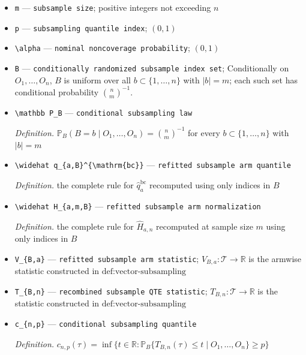 \documentclass{article}
\begin{document}
\begin{itemize}
  \item \texttt{m} --- \texttt{subsample size}; positive integers not exceeding \(n\)
  \item \texttt{p} --- \texttt{subsampling quantile index}; \((0,1)\)
  \item \texttt{\textbackslash{}\allowbreak{}alpha} --- \texttt{nominal noncoverage probability}; \((0,1)\)
  \item \texttt{B} --- \texttt{conditionally randomized subsample index set}; Conditionally on \(O_1,\ldots,O_n\), \(B\) is uniform over all \(b\subset\{1,\ldots,n\}\) with \(|b|=m\); each such set has conditional probability \(\binom{n}{m}^{-1}\).
  \item \texttt{\textbackslash{}\allowbreak{}mathbb P\_\allowbreak{}B} --- \texttt{conditional subsampling law}
  \par\smallskip\noindent\emph{Definition.} \(\mathbb P_B(B=b\mid O_1,\ldots,O_n)=\binom{n}{m}^{-1}\) for every \(b\subset\{1,\ldots,n\}\) with \(|b|=m\)
  \item \texttt{\textbackslash{}\allowbreak{}widehat q\_\allowbreak{}\{a,\allowbreak{}B\}\allowbreak{}\textasciicircum{}\{\textbackslash{}\allowbreak{}mathrm\{bc\}\allowbreak{}\}\allowbreak{}} --- \texttt{refitted subsample arm quantile}
  \par\smallskip\noindent\emph{Definition.} the complete rule for \(\widehat q_a^{\mathrm{bc}}\) recomputed using only indices in \(B\)
  \item \texttt{\textbackslash{}\allowbreak{}widehat H\_\allowbreak{}\{a,\allowbreak{}m,\allowbreak{}B\}\allowbreak{}} --- \texttt{refitted subsample arm normalization}
  \par\smallskip\noindent\emph{Definition.} the complete rule for \(\widehat H_{a,n}\) recomputed at sample size \(m\) using only indices in \(B\)
  \item \texttt{V\_\allowbreak{}\{B,\allowbreak{}a\}\allowbreak{}} --- \texttt{refitted subsample arm statistic}; \(V_{B,a}:\mathcal T\to\mathbb R\) is the armwise statistic constructed in \(\text{def:vector-subsampling}\)
  \item \texttt{T\_\allowbreak{}\{B,\allowbreak{}n\}\allowbreak{}} --- \texttt{recombined subsample QTE statistic}; \(T_{B,n}:\mathcal T\to\mathbb R\) is the statistic constructed in \(\text{def:vector-subsampling}\)
  \item \texttt{c\_\allowbreak{}\{n,\allowbreak{}p\}\allowbreak{}} --- \texttt{conditional subsampling quantile}
  \par\smallskip\noindent\emph{Definition.} \(c_{n,p}(\tau)=\inf\{t\in\mathbb R:\mathbb P_B\{T_{B,n}(\tau)\le t\mid O_1,\ldots,O_n\}\ge p\}\)

\end{itemize}
\end{document}
